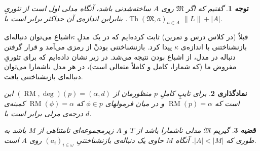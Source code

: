 \documentclass[12pt,a4paper]{report}
\theoremstyle{colorhead}
\newtheorem{thm}{قضیه}
\newtheorem{tav}[thm]{توجه}
\newtheorem{namad}[thm]{نمادگذاری}
\DeclareMathOperator{\Th}{Th}
\DeclareMathOperator{\RM}{RM}
\begin{document}
\begin{tav}
گفتیم که اگر
$\mathfrak{M}$
روی
$A$
ساخته‌شدنی باشد، آنگاه مدلی اول است از تئوریِ
$\Th(\mathfrak{M},a)_{a\in A}$.
بنابراین اندازه‌ی آن حداکثر برابر است با
$\|L\|+|A|$.
\end{tav}
قبلاً (در کلاس درس و تمرین) ثابت کرده‌ایم که در یک مدلِ
$\kappa$اشباع 
می‌توان دنباله‌ای بازنشناختنی با اندازه‌ی
$\kappa$
پیدا کرد. بازنشناختنی بودنْ از رمزی می‌آمد و قرار گرفتن دنباله در مدل، از اشباع بودن نتیجه می‌شد. در زیر نشان داده‌ایم که
برای تئوریِ مفروض ما (که شمارا، کامل و کاملاً متعالی است)، در هر مدل ناشمارا می‌توان دنباله‌ای بازنشناختنی یافت.
\begin{namad}
برای تایپِ کاملِ
$p$
منظورمان از
$(\RM,\deg)(p)=(\alpha,d)$
این است که 
\mbox{$\RM(p)=\alpha$}
و در میان فرمولهای
$\phi\in p$
که
$\RM(\phi)=\alpha$
کمینه‌ی درجه‌ی مرلی برابر است با
$d$.
\end{namad}
\begin{thm}
گیریم
$\mathfrak{M}$
مدلی ناشمارا باشد از
$T$
و
$A$
زیرمجموعه‌ای نامتناهی از
$M$
باشد
به طوری که
$|A|<|M|$.
 آنگاه 
$M$
حاوی یک دنباله‌ی بازنشناختنیِ
$(a_i)_{i\in \omega}$
روی
$A$
است. 
\end{thm}
\end{document}
